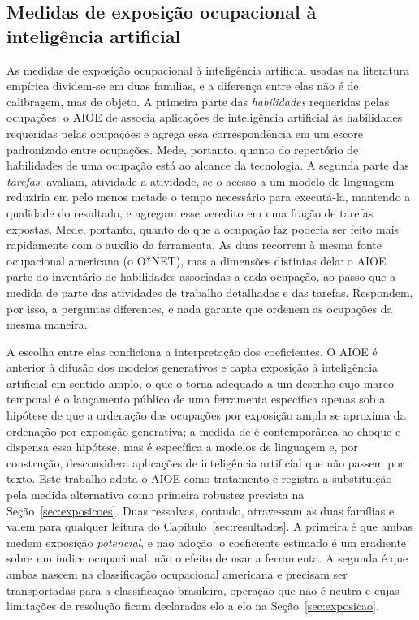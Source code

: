 \subsection{Medidas de exposição ocupacional à inteligência artificial}

As medidas de exposição ocupacional à inteligência artificial usadas na
literatura empírica dividem-se em duas famílias, e a diferença entre elas não é
de calibragem, mas de objeto. A primeira parte das \emph{habilidades}
requeridas pelas ocupações: o AIOE de  associa aplicações
de inteligência artificial às habilidades requeridas pelas ocupações e agrega
essa correspondência em um escore padronizado entre ocupações. Mede, portanto,
quanto do repertório de habilidades de uma ocupação está ao alcance da
tecnologia. A segunda parte das \emph{tarefas}: 
avaliam, atividade a atividade, se o acesso a um modelo de linguagem reduziria
em pelo menos metade o tempo necessário para executá-la, mantendo a qualidade do
resultado, e agregam esse veredito em uma fração de tarefas expostas. Mede,
portanto, quanto do que a ocupação faz poderia ser feito mais rapidamente com o
auxílio da ferramenta. As duas recorrem à mesma fonte ocupacional americana
(o O*NET), mas a dimensões distintas dela: o AIOE parte do inventário de
habilidades associadas a cada ocupação, ao passo que a medida de
 parte das atividades de trabalho detalhadas e das
tarefas. Respondem, por isso, a perguntas diferentes, e nada garante que ordenem
as ocupações da mesma maneira.

A escolha entre elas condiciona a interpretação dos coeficientes. O AIOE é
anterior à difusão dos modelos generativos e capta exposição à inteligência
artificial em sentido amplo, o que o torna adequado a um desenho cujo marco
temporal é o lançamento público de uma ferramenta específica apenas sob a
hipótese de que a ordenação das ocupações por exposição ampla se aproxima da
ordenação por exposição generativa; a medida de  é
contemporânea ao choque e dispensa essa hipótese, mas é específica a modelos de
linguagem e, por construção, desconsidera aplicações de inteligência artificial
que não passem por texto. Este trabalho adota o AIOE como tratamento e registra
a substituição pela medida alternativa como primeira robustez prevista na
Seção~\ref{sec:exposicoes}. Duas ressalvas, contudo, atravessam as duas famílias
e valem para qualquer leitura do Capítulo~\ref{sec:resultados}. A primeira é que
ambas medem exposição \emph{potencial}, e não adoção: o coeficiente estimado é um
gradiente sobre um índice ocupacional, não o efeito de usar a ferramenta. A
segunda é que ambas nascem na classificação ocupacional americana e precisam ser
transportadas para a classificação brasileira, operação que não é neutra e cujas
limitações de resolução ficam declaradas elo a elo na
Seção~\ref{sec:exposicao}.

